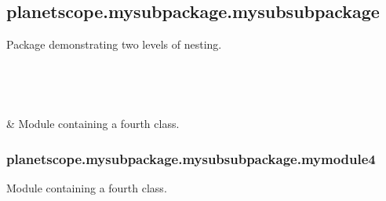 \documentclass[letterpaper,10pt,english]{sphinxmanual}
\begin{document}
\subsection{planetscope.mysubpackage.mysubsubpackage}
\label{\detokenize{_autosummary/planetscope.mysubpackage.mysubsubpackage:module-planetscope.mysubpackage.mysubsubpackage}}\label{\detokenize{_autosummary/planetscope.mysubpackage.mysubsubpackage:planetscope-mysubpackage-mysubsubpackage}}\label{\detokenize{_autosummary/planetscope.mysubpackage.mysubsubpackage::doc}}
\sphinxAtStartPar
Package demonstrating two levels of nesting.


\begin{savenotes}\sphinxatlongtablestart\begin{longtable}[c]{}
\hline

\endfirsthead

%
{}\\
\hline

\endhead

\hline
{}\\
\endfoot

\endlastfoot

\sphinxAtStartPar
{\hyperref[\detokenize{_autosummary/planetscope.mysubpackage.mysubsubpackage.mymodule4:module-planetscope.mysubpackage.mysubsubpackage.mymodule4}]{}}
&
\sphinxAtStartPar
Module containing a fourth class.
\\
\hline
\end{longtable}\sphinxatlongtableend\end{savenotes}


\subsubsection{planetscope.mysubpackage.mysubsubpackage.mymodule4}
\label{\detokenize{_autosummary/planetscope.mysubpackage.mysubsubpackage.mymodule4:module-planetscope.mysubpackage.mysubsubpackage.mymodule4}}\label{\detokenize{_autosummary/planetscope.mysubpackage.mysubsubpackage.mymodule4:planetscope-mysubpackage-mysubsubpackage-mymodule4}}\label{\detokenize{_autosummary/planetscope.mysubpackage.mysubsubpackage.mymodule4::doc}}
\sphinxAtStartPar
Module containing a fourth class.
\end{document}

